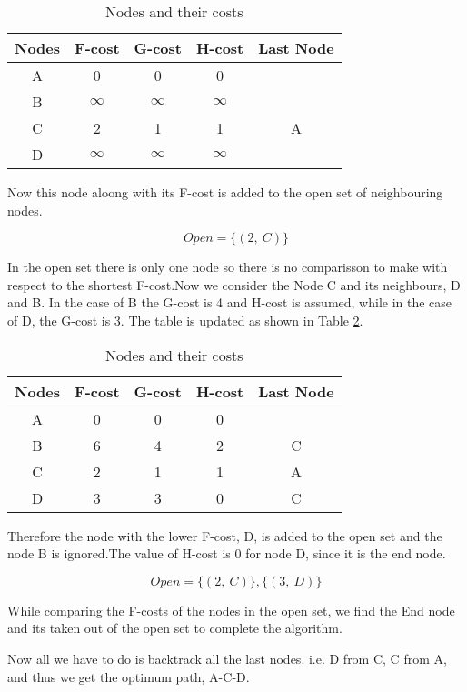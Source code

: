 \begin{table}[H]
\centering
    \begin{tabular}{ |c|c|c|c|c| } 
    \hline
    Nodes & F-cost & G-cost & H-cost & Last Node \\
    \hline 
    A & 0 & 0 & 0 &\\ 
    B & $\infty$ & $\infty$ & $\infty$ &\\ 
    C & 2 & 1 & 1 & A\\ 
    D & $\infty$ & $\infty$ & $\infty$ &\\
    \hline
    \end{tabular}
    \caption{Nodes and their costs}
    \label{table:nodeCost1}
\end{table}

Now this node aloong with its F-cost is added to the open set of neighbouring nodes.

\[Open = \{(2, \ C)\}\]

In the open set there is only one node so there is no comparisson to make with respect to the shortest F-cost.Now we consider the Node C and its neighbours, D and B. In the case of B the G-cost is 4 and H-cost is assumed, while in the case of D, the G-cost is 3. 
    The table is updated as shown in Table \ref{table:nodeCost2}.

\begin{table}[H]
\centering
    \begin{tabular}{ |c|c|c|c|c| } 
    \hline
    Nodes & F-cost & G-cost & H-cost & Last Node \\
    \hline     
    A & 0 & 0 & 0 &\\ 
    B & 6 & 4 & 2 & C\\ 
    C & 2 & 1 & 1 & A\\ 
    D & 3 & 3 & 0 & C\\
    \hline
    \end{tabular}
    \caption{Nodes and their costs}
    \label{table:nodeCost2}
\end{table}

Therefore the node with the lower F-cost, D, is added to the open set and the node B is ignored.The value of H-cost is 0 for node D, since it is the end node.

\[Open = \{(2, \ C)\}, \{(3, \ D)\}\]

While comparing the F-costs of the nodes in the open set, we find the End node and its taken out of the open set to complete the algorithm.

Now all we have to do is backtrack all the last nodes. i.e. D from C, C from A, and thus we get the optimum path, A-C-D.

